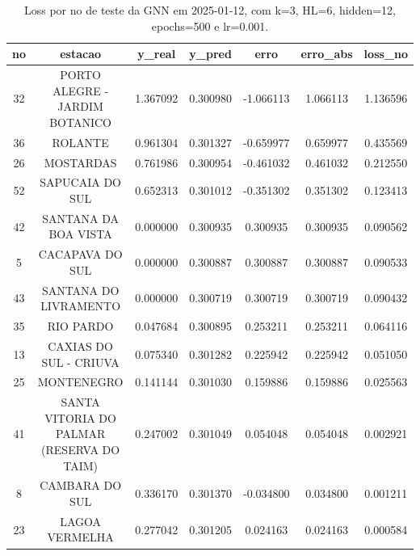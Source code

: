\begin{table}[h]
\centering
\caption{Loss por no de teste da GNN em 2025-01-12, com k=3, HL=6, hidden=12, epochs=500 e lr=0.001.}
\label{tab:gnn_loss_k3_hl6_h12_e500_d20250112}
\begin{tabular}{ccccccc}
\toprule
no & estacao & y\_real & y\_pred & erro & erro\_abs & loss\_no \\
\midrule
32 & PORTO ALEGRE - JARDIM BOTANICO & 1.367092 & 0.300980 & -1.066113 & 1.066113 & 1.136596 \\
36 & ROLANTE & 0.961304 & 0.301327 & -0.659977 & 0.659977 & 0.435569 \\
26 & MOSTARDAS & 0.761986 & 0.300954 & -0.461032 & 0.461032 & 0.212550 \\
52 & SAPUCAIA DO SUL & 0.652313 & 0.301012 & -0.351302 & 0.351302 & 0.123413 \\
42 & SANTANA DA BOA VISTA & 0.000000 & 0.300935 & 0.300935 & 0.300935 & 0.090562 \\
5 & CACAPAVA DO SUL & 0.000000 & 0.300887 & 0.300887 & 0.300887 & 0.090533 \\
43 & SANTANA DO LIVRAMENTO & 0.000000 & 0.300719 & 0.300719 & 0.300719 & 0.090432 \\
35 & RIO PARDO & 0.047684 & 0.300895 & 0.253211 & 0.253211 & 0.064116 \\
13 & CAXIAS DO SUL - CRIUVA & 0.075340 & 0.301282 & 0.225942 & 0.225942 & 0.051050 \\
25 & MONTENEGRO & 0.141144 & 0.301030 & 0.159886 & 0.159886 & 0.025563 \\
41 & SANTA VITORIA DO PALMAR (RESERVA DO TAIM) & 0.247002 & 0.301049 & 0.054048 & 0.054048 & 0.002921 \\
8 & CAMBARA DO SUL & 0.336170 & 0.301370 & -0.034800 & 0.034800 & 0.001211 \\
23 & LAGOA VERMELHA & 0.277042 & 0.301205 & 0.024163 & 0.024163 & 0.000584 \\
\bottomrule
\end{tabular}
\end{table}
